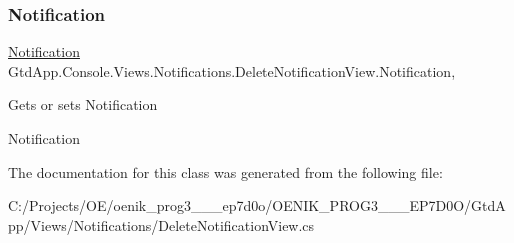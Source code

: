 \subsubsection{\texorpdfstring{Notification}{Notification}}
{\footnotesize\ttfamily \mbox{\hyperlink{class_gtd_app_1_1_data_1_1_notification}{Notification}} Gtd\+App.\+Console.\+Views.\+Notifications.\+Delete\+Notification\+View.\+Notification\hspace{0.3cm}{\ttfamily [get]}, {\ttfamily [set]}}



Gets or sets Notification 

Notification

The documentation for this class was generated from the following file\+:\begin{DoxyCompactItemize}
\item 
C\+:/\+Projects/\+O\+E/oenik\+\_\+prog3\+\_\+\_\+\_\+ep7d0o/\+O\+E\+N\+I\+K\+\_\+\+P\+R\+O\+G3\+\_\+\_\+\_\+\+E\+P7\+D0\+O/\+Gtd\+App/\+Views/\+Notifications/Delete\+Notification\+View.\+cs\end{DoxyCompactItemize}

